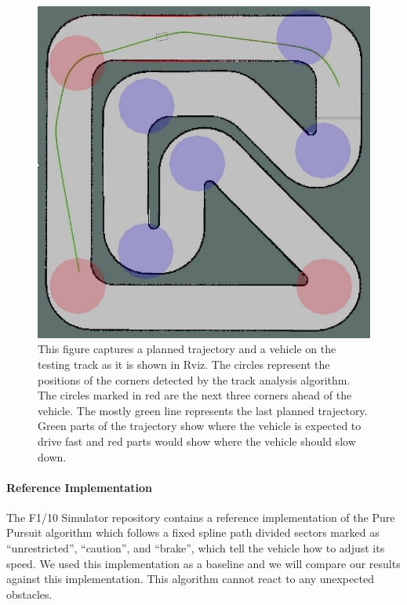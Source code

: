 \begin{figure}
	\label{fig:rviz-planned-track}
	\centering
	\includegraphics[width=\textwidth]{../img/experiments/rviz-planned-track.jpg}
	\caption{This figure captures a planned trajectory and a vehicle on the testing track as it is shown in Rviz. The circles represent the positions of the corners detected by the track analysis algorithm. The circles marked in red are the next three corners ahead of the vehicle. The mostly green line represents the last planned trajectory. Green parts of the trajectory show where the vehicle is expected to drive fast and red parts would show where the vehicle should slow down.}
\end{figure}

\paragraph{Reference Implementation}
The F1/10 Simulator repository contains a reference implementation of the Pure Pursuit algorithm which follows a fixed spline path divided sectors marked as “unrestricted”, “caution”, and “brake”, which tell the vehicle how to adjust its speed. We used this implementation as a baseline and we will compare our results against this implementation. This algorithm cannot react to any unexpected obstacles.

